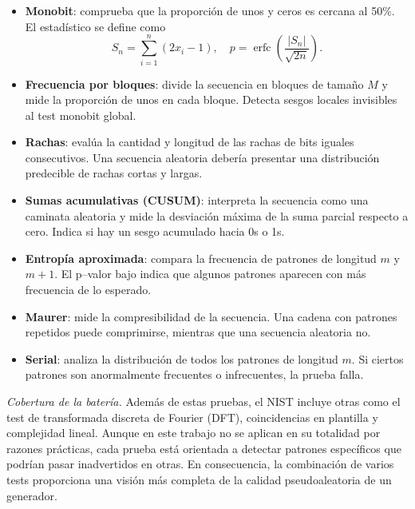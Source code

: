 \begin{itemize}
    \item \textbf{Monobit}: comprueba que la proporción de unos y ceros es
    cercana al 50\%. El estadístico se define como
    \[
    S_n = \sum_{i=1}^{n} (2x_i - 1), \quad
    p = \operatorname{erfc}\left( \frac{|S_n|}{\sqrt{2n}} \right).
    \]

    \item \textbf{Frecuencia por bloques}: divide la secuencia en bloques de
    tamaño $M$ y mide la proporción de unos en cada bloque. Detecta sesgos
    locales invisibles al test monobit global.

    \item \textbf{Rachas}: evalúa la cantidad y longitud de las rachas de bits
    iguales consecutivos. Una secuencia aleatoria debería presentar una
    distribución predecible de rachas cortas y largas.

    \item \textbf{Sumas acumulativas (CUSUM)}: interpreta la secuencia como una
    caminata aleatoria y mide la desviación máxima de la suma parcial respecto a
    cero. Indica si hay un sesgo acumulado hacia 0s o 1s.

    \item \textbf{Entropía aproximada}: compara la frecuencia de patrones de
    longitud $m$ y $m+1$. El p--valor bajo indica que algunos patrones aparecen
    con más frecuencia de lo esperado.

    \item \textbf{Maurer}: mide la compresibilidad de la secuencia. Una cadena
    con patrones repetidos puede comprimirse, mientras que una secuencia
    aleatoria no.

    \item \textbf{Serial}: analiza la distribución de todos los patrones de
    longitud $m$. Si ciertos patrones son anormalmente frecuentes o infrecuentes,
    la prueba falla.
\end{itemize}

\noindent\textit{Cobertura de la batería.}
Además de estas pruebas, el NIST incluye otras como el test de transformada discreta de Fourier (DFT), coincidencias en plantilla y complejidad lineal.
Aunque en este trabajo no se aplican en su totalidad por razones prácticas, cada prueba está orientada a detectar patrones específicos que podrían pasar inadvertidos en otras.
En consecuencia, la combinación de varios tests proporciona una visión más completa de la calidad pseudoaleatoria de un generador.

